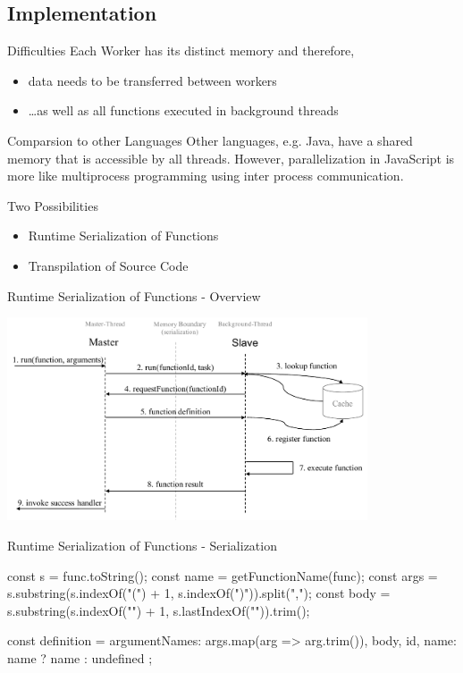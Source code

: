 \subsection{Implementation}

\begin{frame}{Difficulties}
	Each Worker has its distinct memory and therefore, 
	\begin{itemize}
		\item data needs to be transferred between workers
		\item \dots as well as all functions executed in background threads
	\end{itemize}
	
	\vfill
	
	\begin{block}{Comparsion to other Languages}
		Other languages, e.g. Java, have a shared memory that is accessible by all threads. However, 
			parallelization in JavaScript is more like multiprocess programming using inter process communication.
	\end{block}
\end{frame}

\begin{frame}{Two Possibilities}
	\begin{itemize}
		\item Runtime Serialization of Functions
		\item Transpilation of Source Code
	\end{itemize}
\end{frame}

\begin{frame}{Runtime Serialization of Functions - Overview}
	\begin{center}
		\includegraphics[width=0.8\textwidth]{runtime-system}
	\end{center}
\end{frame}

\begin{frame}{Runtime Serialization of Functions - Serialization}
	\begin{javascriptcode}
const s = func.toString();
const name = getFunctionName(func);
const args = s.substring(s.indexOf("(") + 1, s.indexOf(")")).split(",");
const body = s.substring(s.indexOf("{") + 1, s.lastIndexOf("}")).trim();

const definition = {
	argumentNames: args.map(arg => arg.trim()),
	body,
	id,
	name: name ? name : undefined
};
\end{javascriptcode}

\end{frame}


